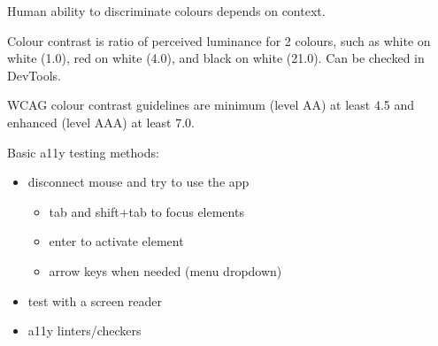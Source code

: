 \documentclass[11pt]{article}
\begin{document}
Human ability to discriminate colours depends on context.

Colour contrast is ratio of perceived luminance for 2 colours, such as
white on white (1.0), red on white (4.0), and black on white (21.0).
Can be checked in DevTools.

WCAG colour contrast guidelines are minimum (level AA) at least 4.5 and
enhanced (level AAA) at least 7.0.

Basic a11y testing methods:
\begin{itemize}
\item disconnect mouse and try to use the app
\begin{itemize}
\item tab and shift+tab to focus elements
\item enter to activate element
\item arrow keys when needed (menu dropdown)
\end{itemize}
\item test with a screen reader
\item a11y linters/checkers
\end{itemize}
\end{document}
